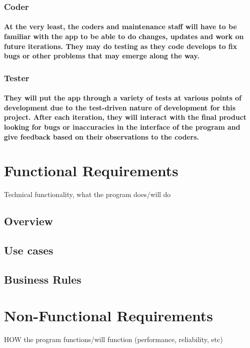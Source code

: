 \documentclass{article}
\begin{document}
\subsubsection{Coder}
\paragraph{\indent At the very least, the coders and maintenance staff will have to be familiar with the app to be able to do changes, updates and work on future iterations. They may do testing as they code develops to fix bugs or other problems that may emerge along the way.}

\subsubsection{Tester}
\paragraph{\indent They will put the app through a variety of tests at various points of development due to the test-driven nature of development for this project. After each iteration, they will interact with the final product looking for bugs or inaccuracies in the interface of the program and give feedback based on their observations to the coders.}

\newpage
\section {Functional Requirements}
Technical functionality, what the program does/will do

\subsection{Overview}
\subsection{Use cases}
\subsection{Business Rules}

\newpage
\section {Non-Functional Requirements}
HOW the program functions/will function (performance, reliability, etc)
\end{document}
